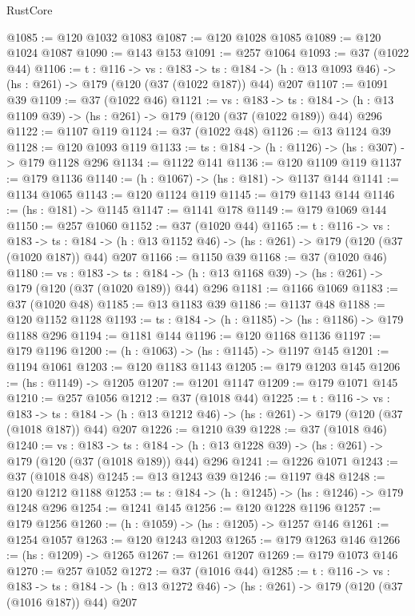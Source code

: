\begin{lexlean}{RustCore}
\begin{coremodule}
@1085 := @120 @1032 @1083
@1087 := @120 @1028 @1085
@1089 := @120 @1024 @1087
@1090 := @143 @153
@1091 := @257 @1064
@1093 := @37 (@1022 @44)
@1106 := {t : @116} ->
  {vs : @183} ->
  {ts : @184} -> (h : @13 @1093 @46) -> (hs : @261) -> @179 (@120 (@37 (@1022 @187)) @44) @207
@1107 := @1091 @39
@1109 := @37 (@1022 @46)
@1121 := {vs : @183} ->
  {ts : @184} -> (h : @13 @1109 @39) -> (hs : @261) -> @179 (@120 (@37 (@1022 @189)) @44) @296
@1122 := @1107 @119
@1124 := @37 (@1022 @48)
@1126 := @13 @1124 @39
@1128 := @120 @1093 @119
@1133 := {ts : @184} -> (h : @1126) -> (hs : @307) -> @179 @1128 @296
@1134 := @1122 @141
@1136 := @120 @1109 @119
@1137 := @179 @1136
@1140 := (h : @1067) -> (hs : @181) -> @1137 @144
@1141 := @1134 @1065
@1143 := @120 @1124 @119
@1145 := @179 @1143 @144
@1146 := (hs : @181) -> @1145
@1147 := @1141 @178
@1149 := @179 @1069 @144
@1150 := @257 @1060
@1152 := @37 (@1020 @44)
@1165 := {t : @116} ->
  {vs : @183} ->
  {ts : @184} -> (h : @13 @1152 @46) -> (hs : @261) -> @179 (@120 (@37 (@1020 @187)) @44) @207
@1166 := @1150 @39
@1168 := @37 (@1020 @46)
@1180 := {vs : @183} ->
  {ts : @184} -> (h : @13 @1168 @39) -> (hs : @261) -> @179 (@120 (@37 (@1020 @189)) @44) @296
@1181 := @1166 @1069
@1183 := @37 (@1020 @48)
@1185 := @13 @1183 @39
@1186 := @1137 @48
@1188 := @120 @1152 @1128
@1193 := {ts : @184} -> (h : @1185) -> (hs : @1186) -> @179 @1188 @296
@1194 := @1181 @144
@1196 := @120 @1168 @1136
@1197 := @179 @1196
@1200 := (h : @1063) -> (hs : @1145) -> @1197 @145
@1201 := @1194 @1061
@1203 := @120 @1183 @1143
@1205 := @179 @1203 @145
@1206 := (hs : @1149) -> @1205
@1207 := @1201 @1147
@1209 := @179 @1071 @145
@1210 := @257 @1056
@1212 := @37 (@1018 @44)
@1225 := {t : @116} ->
  {vs : @183} ->
  {ts : @184} -> (h : @13 @1212 @46) -> (hs : @261) -> @179 (@120 (@37 (@1018 @187)) @44) @207
@1226 := @1210 @39
@1228 := @37 (@1018 @46)
@1240 := {vs : @183} ->
  {ts : @184} -> (h : @13 @1228 @39) -> (hs : @261) -> @179 (@120 (@37 (@1018 @189)) @44) @296
@1241 := @1226 @1071
@1243 := @37 (@1018 @48)
@1245 := @13 @1243 @39
@1246 := @1197 @48
@1248 := @120 @1212 @1188
@1253 := {ts : @184} -> (h : @1245) -> (hs : @1246) -> @179 @1248 @296
@1254 := @1241 @145
@1256 := @120 @1228 @1196
@1257 := @179 @1256
@1260 := (h : @1059) -> (hs : @1205) -> @1257 @146
@1261 := @1254 @1057
@1263 := @120 @1243 @1203
@1265 := @179 @1263 @146
@1266 := (hs : @1209) -> @1265
@1267 := @1261 @1207
@1269 := @179 @1073 @146
@1270 := @257 @1052
@1272 := @37 (@1016 @44)
@1285 := {t : @116} ->
  {vs : @183} ->
  {ts : @184} -> (h : @13 @1272 @46) -> (hs : @261) -> @179 (@120 (@37 (@1016 @187)) @44) @207

\end{coremodule}
\end{lexlean}
